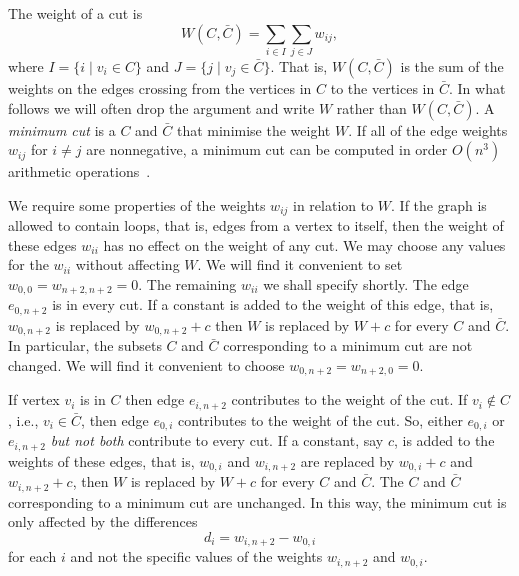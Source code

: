 \documentclass[final,leqno]{siamltex}
\begin{document}
The weight of a cut is
\[
W(C,\bar{C}) = \sum_{i \in I} \sum_{j \in J} w_{ij}, 
\]
where $I = \{ i \mid v_i \in C\}$ and $J = \{j \mid v_j \in \bar{C}\}$.  That is, $W(C,\bar{C})$ is the sum of the weights on the edges crossing from the vertices in $C$ to the vertices in $\bar{C}$.  In what follows we will often drop the argument and write $W$ rather than $W(C,\bar{C})$.  A \emph{minimum cut} is a $C$ and $\bar{C}$ that minimise the weight $W$.  If all of the edge weights $w_{ij}$ for $i \neq j$ are nonnegative, a minimum cut can be computed in 
order $O(n^3)$ arithmetic operations~\cite{Cormen2001,Even_graph_algorithms_1979}.

We require some properties of the weights $w_{ij}$ in relation to $W$.  If the graph is allowed to contain loops, that is, edges from a vertex to itself, then the weight of these edges $w_{ii}$ has no effect on the weight of any cut.  We may choose any values for the $w_{ii}$ without affecting $W$.  We will find it convenient to set $w_{0,0} = w_{n+2,n+2} = 0$.  The remaining $w_{ii}$ we shall specify shortly.  The edge $e_{0,n+2}$ is in every cut.  If a constant is added to the weight of this edge, that is, $w_{0,n+2}$ is replaced by $w_{0,n+2} + c$ then $W$ is replaced by $W + c$ for every $C$ and $\bar{C}$.  In particular, the subsets $C$ and $\bar{C}$ corresponding to a minimum cut are not changed.  We will find it convenient to choose $w_{0,n+2} = w_{n+2,0} = 0$.  

If vertex $v_i$ is in $C$ then edge $e_{i,n+2}$ contributes to the weight of the cut.  If $v_i \notin C$, i.e., $v_i \in \bar{C}$, then edge $e_{0,i}$ contributes to the weight of the cut.  So, either $e_{0,i}$ or $e_{i,n+2}$ \emph{but not both} contribute to every cut.  If a constant, say $c$, is added to the weights of these edges, that is, $w_{0,i}$ and $w_{i,n+2}$ are replaced by $w_{0,i} + c$ and $w_{i,n+2} + c$, then $W$ is replaced by $W + c$ for every $C$ and $\bar{C}$.  The $C$ and $\bar{C}$ corresponding to a minimum cut are unchanged.  In this way, the minimum cut is only affected by the differences 
\[
d_i = w_{i,n+2} - w_{0,i}
\]
for each $i$ and not the specific values of the weights $w_{i,n+2}$ and $w_{0,i}$.  %

\end{document}
